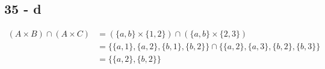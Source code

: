 \documentclass[12pt]{article}
\begin{document}
\subsection*{35 - d}
\begin{align*}
    (A \times B)\cap(A \times C) &= (\{ a, b \} \times \{1,2\}) \cap (\{ a, b \} \times \{2,3\}) \\
    &= \{ \{a, 1\}, \{a, 2\}, \{b, 1\}, \{b, 2\} \} \cap \{ \{a, 2\}, \{a, 3\}, \{b, 2\}, \{b, 3\} \} \\
    &= \{ \{a, 2\}, \{b, 2\} \}
\end{align*}
\end{document}
